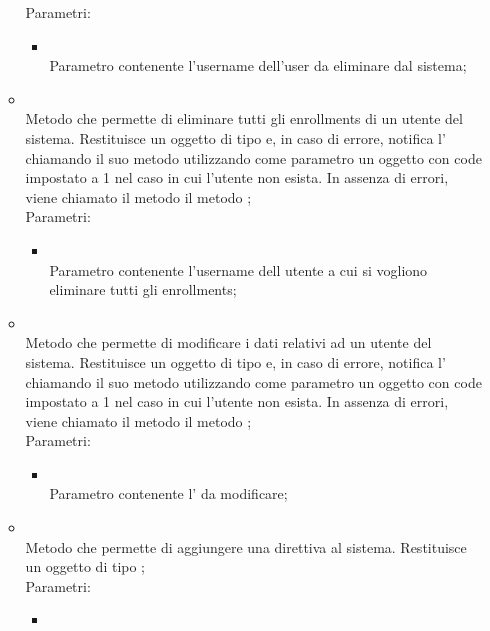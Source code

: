 \begin{itemize}
\begin{itemize}
		Parametri:
		\begin{itemize}
			\item {} \\
			Parametro contenente l'username dell'user da eliminare dal sistema;
		\end{itemize}
		\item[]  \\		Metodo che permette di eliminare tutti gli enrollments di un utente del sistema. Restituisce un oggetto di tipo  e, in caso di errore, notifica l' chiamando il suo metodo  utilizzando come parametro un oggetto  con code impostato a 1 nel caso in cui l'utente non esista. In assenza di errori, viene chiamato il metodo il metodo ;\\
		Parametri:
		\begin{itemize}
			\item {} \\
			Parametro contenente l'username dell utente a cui si vogliono eliminare tutti gli enrollments;
		\end{itemize}
		\item[]  \\		Metodo che permette di modificare i dati relativi ad un utente del sistema. Restituisce un oggetto di tipo  e, in caso di errore, notifica l' chiamando il suo metodo  utilizzando come parametro un oggetto  con code impostato a 1 nel caso in cui l'utente non esista. In assenza di errori, viene chiamato il metodo il metodo ;\\
		Parametri:
		\begin{itemize}
			\item {} \\
			Parametro contenente l' da modificare;
		\end{itemize}
		\item[]  \\		Metodo che permette di aggiungere una direttiva al sistema. Restituisce un oggetto di tipo ;\\
		Parametri:
		\begin{itemize}
			\item {} \\

\end{itemize}
\end{itemize}
\end{itemize}
